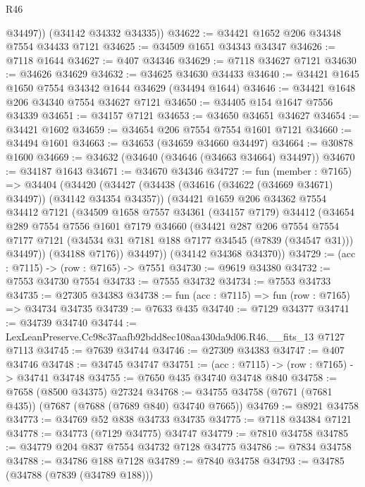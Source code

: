 \begin{lexlean}{R46}
\begin{coremodule}
          @34497))
      (@34142 @34332 @34335))
@34622 := @34421 @1652 @206 @34348 @7554 @34433 @7121
@34625 := @34509 @1651 @34343 @34347
@34626 := @7118 @1644
@34627 := @407 @34346
@34629 := @7118 @34627 @7121
@34630 := @34626 @34629
@34632 := @34625 @34630 @34433
@34640 := @34421 @1645 @1650 @7554 @34342 @1644 @34629 (@34494 @1644)
@34646 := @34421 @1648 @206 @34340 @7554 @34627 @7121
@34650 := @34405 @154 @1647 @7556 @34339
@34651 := @34157 @7121
@34653 := @34650 @34651 @34627
@34654 := @34421 @1602
@34659 := @34654 @206 @7554 @7554 @1601 @7121
@34660 := @34494 @1601
@34663 := @34653 (@34659 @34660 @34497)
@34664 := @30878 @1600
@34669 := @34632 (@34640 (@34646 (@34663 @34664) @34497))
@34670 := @34187 @1643
@34671 := @34670 @34346
@34727 := fun (member : @7165) =>
  @34404
    (@34420
      (@34427
        (@34438 (@34616 (@34622 (@34669 @34671) @34497)) (@34142 @34354 @34357))
        (@34421
          @1659
          @206
          @34362
          @7554
          @34412
          @7121
          (@34509
            @1658
            @7557
            @34361
            (@34157 @7179)
            @34412
            (@34654
              @289
              @7554
              @7556
              @1601
              @7179
              @34660
              (@34421
                @287
                @206
                @7554
                @7554
                @7177
                @7121
                (@34534 @31 @7181 @188 @7177 @34545 (@7839 (@34547 @31)))
                @34497))
            (@34188 @7176))
          @34497))
      (@34142 @34368 @34370))
@34729 := (acc : @7115) -> (row : @7165) -> @7551
@34730 := @9619 @34380
@34732 := @7553 @34730 @7554
@34733 := @7555 @34732
@34734 := @7553 @34733
@34735 := @27305 @34383
@34738 := fun (acc : @7115) => fun (row : @7165) => @34734 @34735
@34739 := @7633 @435
@34740 := @7129 @34377
@34741 := @34739 @34740
@34744 := LexLeanPreserve.Cc98c37aafb92bdd8ec108aa430da9d06.R46.__fits_13 @7127 @7113
@34745 := @7639 @34744
@34746 := @27309 @34383
@34747 := @407 @34746
@34748 := @34745 @34747
@34751 := (acc : @7115) -> (row : @7165) -> @34741 @34748
@34755 := @7650 @435 @34740 @34748 @840
@34758 := @7658 (@8500 @34375) @27324
@34768 := @34755 @34758 (@7671 (@7681 @435)) (@7687 (@7688 (@7689 @840) @34740 @7665))
@34769 := @8921 @34758
@34773 := @34769 @52 @838 @34733 @34735
@34775 := @7118 @34384 @7121
@34778 := @34773 (@7129 @34775) @34747
@34779 := @7810 @34758
@34785 := @34779 @204 @837 @7554 @34732 @7128 @34775
@34786 := @7834 @34758
@34788 := @34786 @188 @7128
@34789 := @7840 @34758
@34793 := @34785 (@34788 (@7839 (@34789 @188)))

\end{coremodule}
\end{lexlean}
